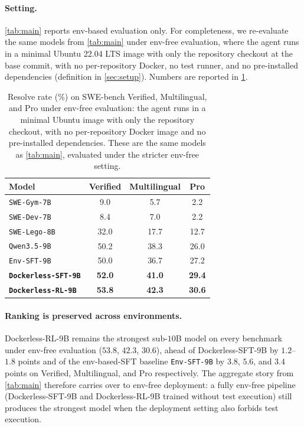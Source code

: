 \documentclass{llmxive}
\providecommand{\approach}{Dockerless\xspace}
\begin{document}
\paragraph{Setting.}
\cref{tab:main} reports env-based evaluation only.
For completeness, we re-evaluate the same models from \cref{tab:main} under env-free evaluation, where the agent runs in a minimal Ubuntu 22.04 LTS image with only the repository checkout at the base commit, with no per-repository Docker, no test runner, and no pre-installed dependencies (definition in \cref{sec:setup}).
Numbers are reported in \cref{tab:main-wo-env}.
\begin{table}[t]
\centering
\small
\begin{tabular}{lccc}
\toprule
\textbf{Model}
& \textbf{Verified}
& \textbf{Multilingual}
& \textbf{Pro} \\
\midrule
\texttt{SWE-Gym-7B}                & 9.0  & 5.7  & 2.2  \\
\texttt{SWE-Dev-7B}                & 8.4  & 7.0  & 2.2  \\
\texttt{SWE-Lego-8B}               & 32.0 & 17.7 & 12.7 \\
\texttt{Qwen3.5-9B}                & 50.2 & 38.3 & 26.0 \\
\midrule
\texttt{Env-SFT-9B}                & 50.0 & 36.7 & 27.2 \\
\rowcolor{black!4}
\textbf{\texttt{\approach-SFT-9B}} & \textbf{52.0} & \textbf{41.0} & \textbf{29.4} \\
\rowcolor{black!4}
\textbf{\texttt{\approach-RL-9B}}  & \textbf{53.8} & \textbf{42.3} & \textbf{30.6} \\
\bottomrule
\end{tabular}%
\caption{
Resolve rate (\%) on SWE-bench Verified, Multilingual, and Pro under env-free evaluation: the agent runs in a minimal Ubuntu image with only the repository checkout, with no per-repository Docker image and no pre-installed dependencies.
These are the same models as \cref{tab:main}, evaluated under the stricter env-free setting.
}
\label{tab:main-wo-env}
\end{table}

\paragraph{Ranking is preserved across environments.}
\approach-RL-9B remains the strongest sub-$10$B model on every benchmark under env-free evaluation ($53.8$, $42.3$, $30.6$), ahead of \approach-SFT-9B by $1.2$--$1.8$ points and of the env-based-SFT baseline \texttt{Env-SFT-9B} by $3.8$, $5.6$, and $3.4$ points on Verified, Multilingual, and Pro respectively.
The aggregate story from \cref{tab:main} therefore carries over to env-free deployment: a fully env-free pipeline (\approach-SFT-9B and \approach-RL-9B trained without test execution) still produces the strongest model when the deployment setting also forbids test execution.
\end{document}
